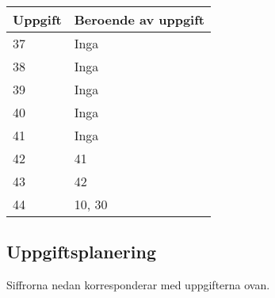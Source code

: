 \documentclass[a4paper, twoside, 11pt, titlepage]{article}
\begin{document}
	\begin {table} [ht] \begin{tabular} {  p{7.5cm} p{7.5cm} }
		\hline
		{\sffamily\textbf{Uppgift}} & {\sffamily\textbf{Beroende av uppgift}} \\
		\hline
		{37} & {Inga} \\
		\hline
		{38} & {Inga} \\
		\hline
		{39} & {Inga} \\
		\hline
		{40} & {Inga} \\
		\hline
		{41} & {Inga} \\
		\hline
		{42} & {41} \\
		\hline
		{43} & {42} \\
		\hline
		{44} & {10, 30} \\
		\hline
	\end{tabular} \end{table} \FloatBarrier


	\subsection{Uppgiftsplanering}


	Siffrorna nedan korresponderar med uppgifterna ovan.
\end{document}
